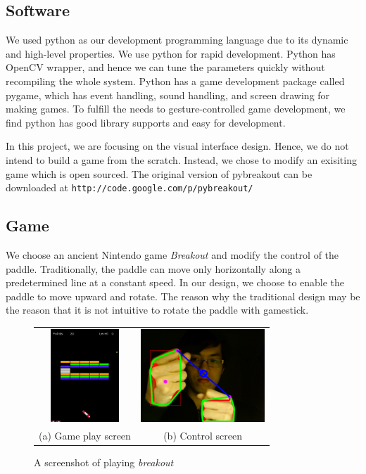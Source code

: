 \documentclass[10pt,twocolumn,letterpaper]{article}
\begin{document}
\subsection{Software}
We used python as our development programming language due to 
its dynamic and high-level properties. We use python for rapid 
development. Python has OpenCV wrapper, and hence we can tune 
the parameters quickly without recompiling the whole system. 
Python has a game development package called pygame, which 
has event handling, sound handling, and screen drawing for making 
games. To fulfill the needs to gesture-controlled game development, 
we find python has good library supports and easy for development.

In this project, we are focusing on the visual interface 
design. Hence, we do not intend to build a game from the scratch. 
Instead, we chose to modify an exisiting game which is open sourced. 
The original version of pybreakout can be downloaded at
\verb"http://code.google.com/p/pybreakout/"

\subsection{Game}
We choose an ancient Nintendo game \emph{Breakout} and modify 
the control of the paddle. Traditionally, the paddle can 
move only horizontally along a predetermined line at a constant speed.
In our design, we choose to enable the paddle to move upward and rotate.
The reason why the traditional design may be the reason that 
it is not intuitive to rotate the paddle with gamestick.
\begin{figure}[h]
\centering
\begin{tabular}{cc}
\includegraphics[height=3.5cm]{game0060.png} &
\includegraphics[height=3.5cm]{gesture0060.png} \\
(a) Game play screen &
(b) Control screen
\end{tabular}
\caption{A screenshot of playing \emph{breakout}}
\label{fig:gamescreen}
\end{figure}
\end{document}
